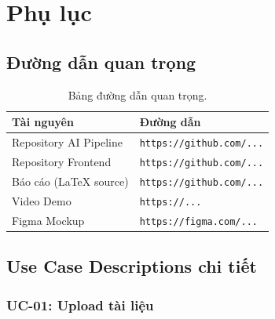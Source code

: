 \section*{Phụ lục}

\subsection*{Đường dẫn quan trọng}

\begin{table}[H]
    \centering
    \begin{tabular}{p{5cm}p{9.5cm}}
        \toprule
        \textbf{Tài nguyên} & \textbf{Đường dẫn} \\
        \midrule
        Repository AI Pipeline   & \texttt{https://github.com/...} \\
        Repository Frontend      & \texttt{https://github.com/...} \\
        Báo cáo (LaTeX source)   & \texttt{https://github.com/...} \\
        Video Demo               & \texttt{https://...} \\
        Figma Mockup             & \texttt{https://figma.com/...} \\
        \bottomrule
    \end{tabular}
    \caption*{Bảng đường dẫn quan trọng.}
\end{table}

\subsection*{Use Case Descriptions chi tiết}

\subsubsection*{UC-01: Upload tài liệu}

